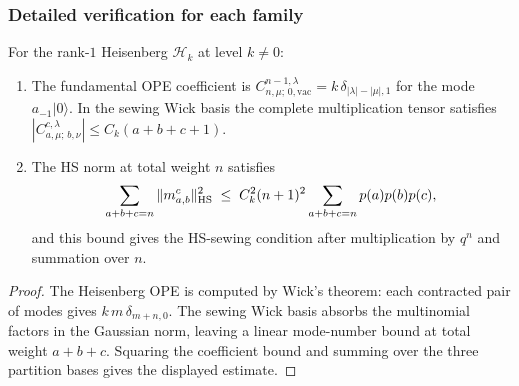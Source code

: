 \subsubsection{Detailed verification for each family}

\begin{proposition}
\label{prop:thqg-I-heisenberg-detail}
For the rank-$1$ Heisenberg $\mathcal{H}_k$ at level $k \neq 0$:
\begin{enumerate}[label=\textup{(\roman*)}]
\item The fundamental OPE coefficient is
$C^{n-1,\lambda}_{n,\mu;\,0,\mathrm{vac}}
= k\,\delta_{|\lambda|-|\mu|,1}$ for the mode
$a_{-1}|0\rangle$. In the sewing Wick basis the complete
multiplication tensor satisfies
$|C^{c,\lambda}_{a,\mu;\,b,\nu}|
\leq C_k(a+b+c+1)$.
\item The HS norm at total weight $n$ satisfies
 \begin{equation}%
 \sum_{\substack{a+b+c = n}} \|m^c_{a,b}\|_{\HS}^2
 \;\leq\;
 C_k^2(n+1)^2
 \sum_{\substack{a+b+c=n}} p(a)p(b)p(c),
 \end{equation}
and this bound gives the HS-sewing condition after multiplication by
$q^n$ and summation over $n$.
\end{enumerate}
\end{proposition}

\begin{proof}
The Heisenberg OPE is computed by Wick's theorem: each contracted pair
of modes gives $k\,m\,\delta_{m+n,0}$. The sewing Wick basis absorbs the
multinomial factors in the Gaussian norm, leaving a linear mode-number
bound at total weight $a+b+c$. Squaring the coefficient bound and
summing over the three partition bases gives the displayed estimate.
\end{proof}

